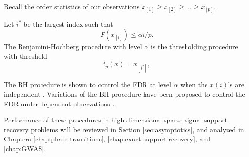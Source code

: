 Recall the order statistics of our observations $x_{[1]} \ge x_{[2]}  \ge \ldots \ge x_{[p]}$.
\begin{definition}
Let $i^*$ be the largest index such that
$$
\overline{F}(x_{[i]}) \le \alpha i/p.
$$
The Benjamini-Hochberg procedure with level $\alpha$ is the thresholding procedure with threshold
\begin{equation} \label{eq:BH-procedure}
    t_p(x) = x_{[i^*]},
\end{equation}
\end{definition}
The \ac{BH} procedure is shown to control the FDR at level $\alpha$ when the $x(i)$'s are independent \citep{benjamini1995controlling}.
Variations of the \ac{BH} procedure have been proposed to control the \ac{FDR} under dependent observations \citep{benjamini2001control}.


Performance of these procedures in high-dimensional sparse signal support recovery problems will be reviewed in Section \ref{sec:asymptotics}, and analyzed in Chapters \ref{chap:phase-transitions}, \ref{chap:exact-support-recovery}, and \ref{chap:GWAS}.
